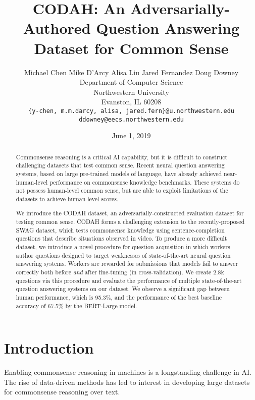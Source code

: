\documentclass[11pt,a4paper]{article}
\title{CODAH: An Adversarially-Authored Question Answering Dataset for Common Sense}
\author{Michael Chen \quad Mike D'Arcy \quad Alisa Liu \quad Jared Fernandez \quad Doug Downey \\ Department of Computer Science \\ Northwestern University \\ Evanston, IL 60208 \\ 
{\small \texttt{\{y-chen, m.m.darcy, alisa, jared.fern\}@u.northwestern.edu}}\\  {\texttt{\small ddowney@eecs.northwestern.edu}}}
\date{June 1, 2019}
\begin{document}
\maketitle
\begin{abstract}
    Commonsense reasoning is a critical AI capability, but it is difficult to construct challenging datasets that test common sense. Recent neural question answering systems, based on large pre-trained models of language, have already achieved near-human-level performance on commonsense knowledge benchmarks. These systems do not possess human-level common sense, but are able to exploit limitations of the datasets to achieve human-level scores.
    
    We introduce the CODAH dataset, an adversarially-constructed evaluation dataset for testing common sense. CODAH forms a challenging extension to the recently-proposed SWAG dataset, which tests commonsense knowledge using sentence-completion questions that describe situations observed in video. To produce a more difficult dataset, we introduce a novel procedure for question acquisition in which workers author questions designed to target weaknesses of state-of-the-art neural question answering systems. Workers are rewarded for submissions that models fail to answer correctly both before {\em and} after fine-tuning (in cross-validation). We create 2.8k questions via this procedure and evaluate the performance of multiple state-of-the-art question answering systems on our dataset. We observe a significant gap between human performance, which is 95.3\%, and the performance of the best baseline accuracy of 67.5\% by the BERT-Large model.
\end{abstract}

\section{Introduction}
    Enabling commonsense reasoning in machines is a longstanding challenge in AI.  The rise of data-driven methods has led to interest in developing large datasets for commonsense reasoning over text. 
\end{document}
